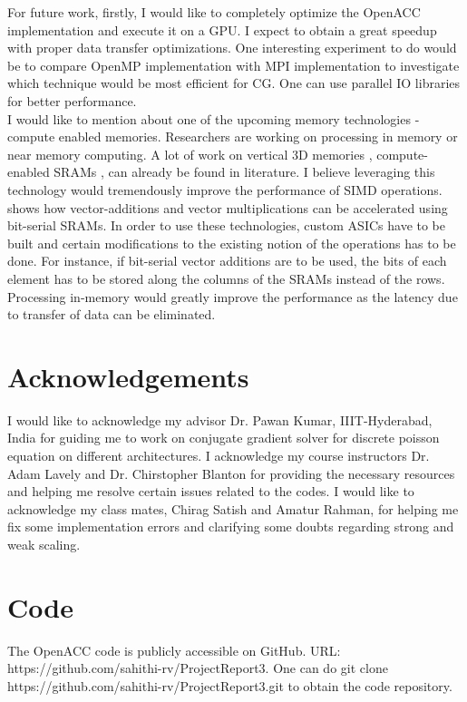 \documentclass{article}
\begin{document}
\begin{spacing}{1.1}
For future work, firstly, I would like to completely optimize the OpenACC implementation and execute it on a GPU. I expect to obtain a great speedup with proper data transfer optimizations. One interesting experiment to do would be to compare OpenMP implementation with MPI implementation to investigate which technique would be most efficient for CG. One can use parallel IO libraries for better performance.\\

I would like to mention about one of the upcoming memory technologies - compute enabled memories. Researchers are working on processing in memory or near memory computing. A lot of work on vertical 3D memories  \cite{inmemory}, compute-enabled SRAMs \cite{neuralcache}, can already be found in literature. I believe leveraging this technology would tremendously improve the performance of SIMD operations. \cite{neuralcache} shows how  vector-additions and vector multiplications can be accelerated using bit-serial SRAMs. In order to use these technologies, custom ASICs have to be built and certain modifications to the existing notion of the operations has to be done. For instance, if bit-serial vector additions are to be used, the bits of each element has to be stored along the columns of the SRAMs instead of the rows. Processing in-memory would greatly improve the performance as the latency due to transfer of data can be eliminated. 

\newpage
\begin{appendices}

\section{Acknowledgements}
I would like to acknowledge my advisor Dr. Pawan Kumar, IIIT-Hyderabad, India for guiding me to work on conjugate gradient solver for discrete poisson equation on different architectures. I acknowledge my course instructors Dr. Adam Lavely and Dr. Chirstopher Blanton for providing the necessary resources and helping me resolve certain issues related to the codes.
I would like to acknowledge my class mates, Chirag Satish and Amatur Rahman, for helping me fix some implementation errors and clarifying some doubts regarding strong and weak scaling.

\section{Code}

The OpenACC code  is publicly accessible on GitHub. URL: https://github.com/sahithi-rv/ProjectReport3.
One can do git clone https://github.com/sahithi-rv/ProjectReport3.git to obtain the code repository.


\end{appendices}
\end{spacing}
\end{document}
